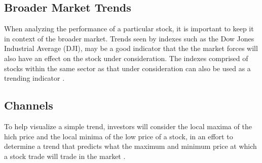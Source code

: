 \subsection{Broader Market Trends}
%
When analyzing the performance of a particular stock, it is important to keep it in context of the broader market.  Trends seen by indexes such as the Dow Jones Industrial Average (DJI), may be a good indicator that the the market forces will also have an effect on the stock under consideration.  The indexes comprised of stocks within the same sector as that under consideration can also be used as a trending indicator \cite{Bonon}.
%
\subsection{Channels}
%
To help visualize a simple trend, investors will consider the local maxima of the hich price and the local minima of the low price of a stock, in an effort to determine a trend that predicts what the maximum and minimum price at which a stock trade will trade in the market \cite{Barbara}.
%
